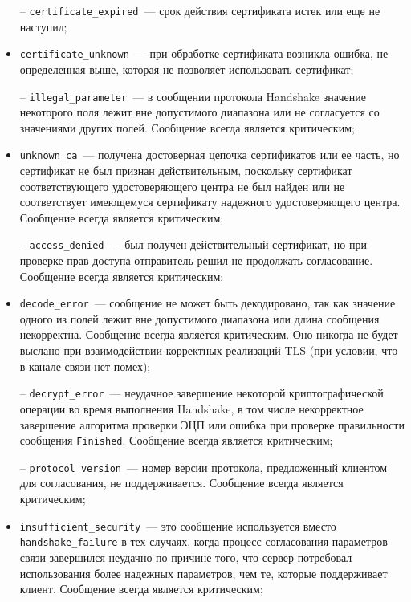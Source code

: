 \begin{itemize}
\item[--]
\lstinline{certificate_expired}~--- срок действия сертификата истек 
или еще не наступил; 

\item[--]
\lstinline{certificate_unknown}~--- при обработке сертификата 
возникла ошибка, не определенная выше, которая не позволяет использовать 
сертификат; 

\item[--]
\lstinline{illegal_parameter}~--- в сообщении протокола Handshake 
значение некоторого поля лежит вне допустимого диапазона или не 
согласуется со значениями других полей. Сообщение всегда является 
критическим; 

\item[--]
\lstinline{unknown_ca}~--- получена достоверная цепочка сертификатов 
или ее часть, но сертификат не был признан действительным, поскольку 
сертификат соответствующего удостоверяющего центра не был найден или не 
соответствует имеющемуся сертификату надежного удостоверяющего центра. 
Сообщение всегда является критическим; 

\item[--]
\lstinline{access_denied}~--- был получен действительный сертификат, 
но при проверке прав доступа отправитель решил не продолжать согласование. 
Сообщение всегда является критическим; 

\item[--]
\lstinline{decode_error}~--- сообщение не может быть декодировано, 
так как значение одного из полей лежит вне допустимого диапазона или длина 
сообщения некорректна. Сообщение всегда является критическим. Оно никогда 
не будет выслано при взаимодействии корректных реализаций TLS (при 
условии, что в канале связи нет помех); 

\item[--]
\lstinline{decrypt_error}~--- неудачное завершение некоторой 
криптографической операции во время выполнения Handshake, в том числе 
некорректное завершение алгоритма проверки ЭЦП или ошибка при проверке 
правильности сообщения \lstinline{Finished}. Сообщение всегда является критическим; 

\item[--]
\lstinline{protocol_version}~--- номер версии протокола, предложенный 
клиентом для согласования, не поддерживается. Сообщение всегда является 
критическим; 

\item[--]
\lstinline{insufficient_security}~--- это сообщение используется вместо 
\lstinline{handshake_failure} в тех случаях, когда процесс согласования  
параметров связи завершился неудачно по причине того, что сервер 
потребовал использования более надежных параметров, чем те, которые 
поддерживает клиент. Сообщение всегда является критическим; 


\end{itemize}
